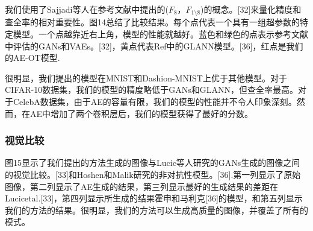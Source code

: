 我们使用了Sajjadi等人在参考文献中提出的($F_8$，$F_{1 \setminus  8}$)的概念。[32]来量化精度和查全率的相对重要性。图14总结了比较结果。每个点代表一个具有一组超参数的特定模型。一个点越靠近右上角，模型的性能就越好。蓝色和绿色的点表示参考文献中评估的GANs和VAEs。[32]，黄点代表Ref中的GLANN模型。[36]，红点是我们的AE-OT模型.

很明显，我们提出的模型在MNIST和Dashion-MNIST上优于其他模型。对于CIFAR-10数据集，我们的模型的精度略低于GANs和GLANN，但查全率最高。对于CelebA数据集，由于AE的容量有限，我们的模型的性能并不令人印象深刻。然而，在AE中增加了两个卷积层后，我们的模型获得了最好的分数。

\subsubsection{视觉比较}

图15显示了我们提出的方法生成的图像与Lucic等人研究的GANs生成的图像之间的视觉比较。[33]和Hoshen和Malik研究的非对抗性模型。[36].第一列显示了原始图像，第二列显示了AE生成的结果，第三列显示最好的生成结果的差距在Lucicetal.[33]，第四列显示所生成的结果霍申和马利克[36]的模型，和第五列显示我们的方法的结果。很明显，我们的方法可以生成高质量的图像，并覆盖了所有的模式。